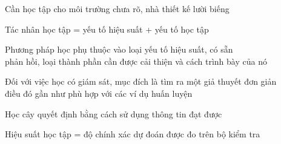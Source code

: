 \documentclass{article}
\begin{document}
\begin{huge}

Cần học tập cho môi trường chưa rõ, nhà thiết kế lười biếng

Tác nhân học tập = yếu tố hiệu suất + yếu tố học tập

Phương pháp học phụ thuộc vào loại yếu tố hiệu suất, có sẵn\\
phản hồi, loại thành phần cần được cải thiện và cách trình bày của nó

Đối với việc học có giám sát, mục đích là tìm ra một giả thuyết đơn giản\\
điều đó gần như phù hợp với các ví dụ huấn luyện

Học cây quyết định bằng cách sử dụng thông tin đạt được 

Hiệu suất học tập = độ chính xác dự đoán được đo trên bộ kiểm tra

\end{huge}
\end{document}
